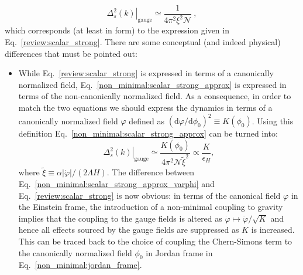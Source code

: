 \begin{equation}
	\label{non_minimal:scalar_strong_approx}
 	\left.  \Delta^2_s (k) \right|_{\text{gauge}} \simeq  \frac{  1 }{ 4 \pi^2 \xi^2 \mathcal{N} }  \ ,
 \end{equation}
which corresponds (at least in form) to the expression given in Eq.~\eqref{review:scalar_strong}. There are some conceptual (and indeed physical) differences that must be pointed out:
\begin{itemize}
	\item While Eq.~\eqref{review:scalar_strong} is expressed in terms of a canonically normalized field, Eq.~\eqref{non_minimal:scalar_strong_approx} is expressed in terms of the non-canonically normalized field. As a consequence, in order to match the two equations we should express the dynamics in terms of a canonically normalized field $\varphi$ defined as $(\textrm{d} \varphi / \textrm{d} \phi_0)^2 \equiv K(\phi_0)$. Using this definition Eq.~\eqref{non_minimal:scalar_strong_approx} can be turned into:
	\begin{equation}
	\label{non_minimal:scalar_strong_approx_varphi}
 	\left.  \Delta^2_s (k) \right|_\text{gauge} \simeq  \frac{  K(\phi_0) }{ 4 \pi^2 \mathcal{N}   \tilde{\xi}^2 }  \propto \frac{K}{\epsilon_H} ,
 \end{equation}
	where $\tilde{\xi} \equiv \alpha |\dot{\varphi}| / (2 \Lambda H )$. The difference between Eq.~\eqref{non_minimal:scalar_strong_approx_varphi} and Eq.~\eqref{review:scalar_strong} is now obvious: in terms of the canonical field $\varphi$ in the Einstein frame, the introduction of a non-minimal coupling to gravity implies that the coupling to the gauge fields is altered as $\dot \varphi \mapsto \dot \varphi/\sqrt{K}$ and hence all effects sourced by the gauge fields are suppressed as $K$ is increased. This can be traced back to the choice of coupling the Chern-Simons term to the canonically normalized field $\phi_0$ in Jordan frame in Eq.~\eqref{non_minimal:jordan_frame}.
	

\end{itemize}
